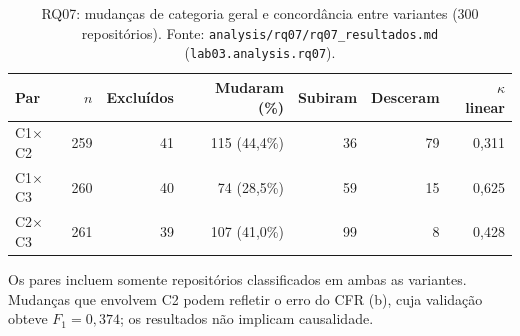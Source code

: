 \begin{table}[ht]
\centering
\caption{RQ07: mudanças de categoria geral e concordância entre variantes
(300 repositórios). Fonte: \texttt{analysis/rq07/rq07\_resultados.md}
(\texttt{lab03.analysis.rq07}).}
\label{tab:rq07}
\small
\begin{tabular}{lrrrrrr}
\hline
Par & $n$ & Excluídos & Mudaram (\%) & Subiram & Desceram & $\kappa$ linear \\
\hline
C1$\times$C2 & 259 & 41 & 115 (44,4\%) & 36 & 79 & 0,311 \\
C1$\times$C3 & 260 & 40 & 74 (28,5\%) & 59 & 15 & 0,625 \\
C2$\times$C3 & 261 & 39 & 107 (41,0\%) & 99 & 8 & 0,428 \\
\hline
\end{tabular}
\end{table}

Os pares incluem somente repositórios classificados em ambas as variantes.
Mudanças que envolvem C2 podem refletir o erro do CFR (b), cuja validação
obteve $F_1 = 0,374$; os resultados não implicam causalidade.
